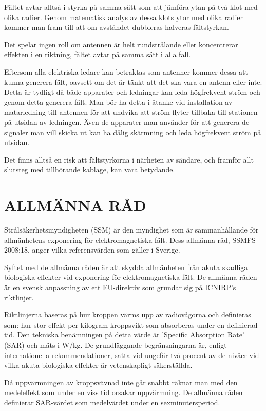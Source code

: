 Fältet avtar alltså i styrka på samma sätt som att jämföra ytan på två
klot med olika radier. Genom matematisk analys av dessa klots ytor med
olika radier kommer man fram till att om avståndet dubbleras halveras
fältstyrkan.

Det spelar ingen roll om antennen är helt rundstrålande eller
koncentrerar effekten i en riktning, fältet avtar på samma sätt i
alla fall.

Eftersom alla elektriska ledare kan betraktas som antenner kommer
dessa att kunna generera fält, oavsett om det är tänkt att det ska
vara en antenn eller inte. Detta är tydligt då både apparater och
ledningar kan leda högfrekvent ström och genom detta generera fält.
Man bör ha detta i åtanke vid installation av matarledning till
antennen för att undvika att ström flyter tillbaka till stationen på
utsidan av ledningen. Även de apparater man använder för att generera
de signaler man vill skicka ut kan ha dålig skärmning och leda
högfrekvent ström på utsidan.

Det finns alltså en risk att fältstyrkorna i närheten av sändare, och
framför allt slutsteg med tillhörande kablage, kan vara betydande.

\section{ALLMÄNNA RÅD}

Strålsäkerhetsmyndigheten (SSM) är den myndighet som är sammanhållande
för allmänhetens exponering för elektromagnetiska fält. Dess allmänna
råd, SSMFS 2008:18, anger vilka referensvärden som gäller i Sverige.

Syftet med de allmänna råden är att skydda allmänheten från akuta
skadliga biologiska effekter vid exponering för elektromagnetiska fält.
De allmänna råden är en svensk anpassning av ett EU-direktiv som
grundar sig på ICNIRP’s riktlinjer.

Riktlinjerna baseras på hur kroppen värms upp av radiovågorna och
definieras som: hur stor effekt per kilogram kroppsvikt som absorberas
under en definierad tid. Den tekniska benämningen på detta värde är
’Specific Absorption Rate’ (SAR) och mäts i W/kg.
De grundläggande begränsningarna är, enligt internationella
rekommendationer, satta vid ungefär två procent av de nivåer vid
vilka akuta biologiska effekter är vetenskapligt säkerställda.

Då uppvärmningen av kroppsvävnad inte går snabbt räknar man med den
medeleffekt som under en viss tid orsakar uppvärmning. De allmänna
råden definierar SAR-värdet som medelvärdet under en sexminutersperiod.

